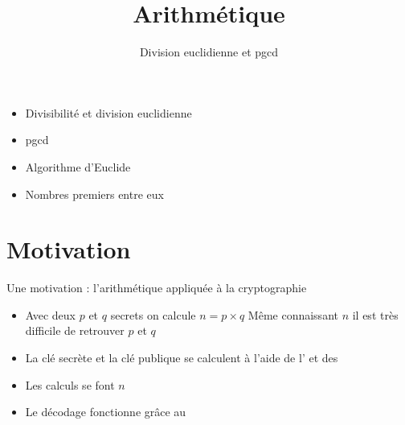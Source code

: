 










\title{{\bf Arithmétique}}
\subtitle{Division euclidienne et pgcd}

\begin{frame}
  
  \debutmontitre

  \pause

{\footnotesize
\hfill
{}
\begin{minipage}{0.6\textwidth}
  \begin{itemize}
    \item<3-> Divisibilité et division euclidienne
    \item<4-> pgcd
    \item<5-> Algorithme d'Euclide
    \item<6-> Nombres premiers entre eux
  \end{itemize}
\end{minipage}
}

\end{frame}

\setcounter{framenumber}{0}




\section*{Motivation}


\begin{frame}
Une motivation : l'arithmétique appliquée à la cryptographie
\pause
\begin{itemize}
  \item Avec deux  $p$ et $q$ secrets on calcule $n=p\times q$
\pause
Même connaissant $n$ il est très difficile de retrouver $p$ et $q$ 
\pause
  \item La clé secrète et la clé publique se calculent à l'aide de l' 
et des 
\pause
  \item Les calculs se font  $n$
\pause
  \item Le décodage fonctionne grâce au 
\end{itemize}
\end{frame}


